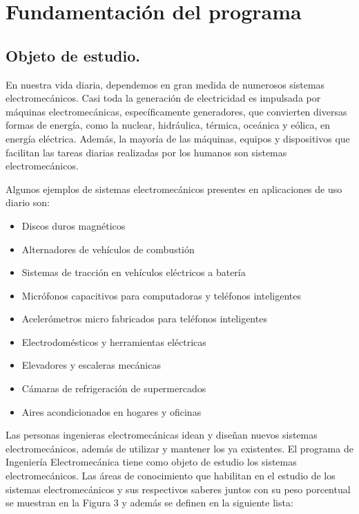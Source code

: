 
\section*{Fundamentación del programa}

\subsection*{Objeto de estudio.}

En nuestra vida diaria, dependemos en gran medida de numerosos sistemas electromecánicos. Casi toda la generación de electricidad es impulsada por máquinas electromecánicas, específicamente generadores, que convierten diversas formas de energía, como la nuclear, hidráulica, térmica, oceánica y eólica, en energía eléctrica. Además, la mayoría de las máquinas, equipos y dispositivos que facilitan las tareas diarias realizadas por los humanos son sistemas electromecánicos.\par

Algunos ejemplos de sistemas electromecánicos presentes en aplicaciones de uso diario son:\par

\begin{itemize}
\item Discos duros magnéticos
\item Alternadores de vehículos de combustión
\item Sistemas de tracción en vehículos eléctricos a batería
\item Micrófonos capacitivos para computadoras y teléfonos inteligentes
\item Acelerómetros micro fabricados para teléfonos inteligentes
\item Electrodomésticos y herramientas eléctricas
\item Elevadores y escaleras mecánicas
\item Cámaras de refrigeración de supermercados
\item Aires acondicionados en hogares y oficinas
\end{itemize}
Las personas ingenieras electromecánicas idean y diseñan nuevos sistemas electromecánicos, además de utilizar y mantener los ya existentes. El programa de Ingeniería Electromecánica tiene como objeto de estudio los sistemas electromecánicos. Las áreas de conocimiento que habilitan en el estudio de los sistemas electromecánicos y sus respectivos saberes juntos con su peso porcentual se muestran en la Figura\textbf{ }3 y además se definen en la siguiente lista:\par


